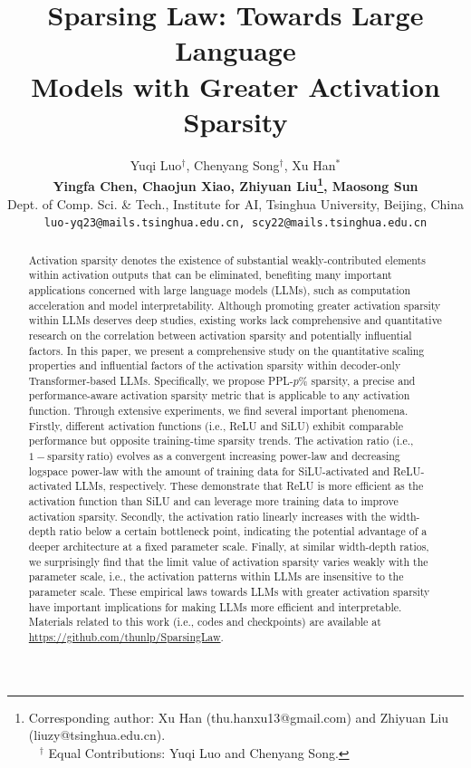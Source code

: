 \documentclass{article} %
\title{Sparsing Law: Towards Large Language \\Models with Greater Activation Sparsity}
\author{Yuqi Luo$^{\dagger}$, Chenyang Song$^{\dagger}$, Xu Han$^{*}$\\
\textbf{Yingfa Chen}\textbf{, Chaojun Xiao}\textbf{, Zhiyuan Liu\thanks{ Corresponding author: Xu Han (thu.hanxu13@gmail.com) and Zhiyuan Liu (liuzy@tsinghua.edu.cn).\\ $^{\quad\ \dagger}$ Equal Contributions: Yuqi Luo and Chenyang Song.}}\textbf{, Maosong Sun}\\
{\small Dept. of Comp. Sci. \& Tech., Institute for AI, Tsinghua University, Beijing, China}\\
{\tt\small luo-yq23@mails.tsinghua.edu.cn, scy22@mails.tsinghua.edu.cn}
}
\begin{document}
\maketitle

\begin{abstract}

Activation sparsity denotes the existence of substantial weakly-contributed elements within activation outputs that can be eliminated, benefiting many important applications concerned with large language models (LLMs), such as computation acceleration and model interpretability. 
Although promoting greater activation sparsity within LLMs deserves deep studies, existing works lack comprehensive and quantitative research on the correlation between activation sparsity and potentially influential factors.
In this paper, we present a comprehensive study on the quantitative scaling properties and influential factors of the activation sparsity within decoder-only Transformer-based LLMs. 
Specifically, we propose PPL-$p\%$ sparsity, a precise and performance-aware activation sparsity metric that is applicable to any activation function. 
Through extensive experiments, we find several important phenomena.
Firstly, different activation functions (i.e., ReLU and SiLU) exhibit comparable performance but opposite training-time sparsity trends. The activation ratio (i.e., $1-\mathrm{sparsity\ ratio}$) evolves as a convergent increasing power-law and decreasing logspace power-law with the amount of training data for SiLU-activated and ReLU-activated LLMs, respectively. These demonstrate that ReLU is more efficient as the activation function than SiLU and can leverage more training data to improve activation sparsity.
Secondly, the activation ratio linearly increases with the width-depth ratio below a certain bottleneck point, indicating the potential advantage of a deeper architecture at a fixed parameter scale.
Finally, at similar width-depth ratios, we surprisingly find that the limit value of activation sparsity varies weakly with the parameter scale, i.e., the activation patterns within LLMs are insensitive to the parameter scale. These empirical laws towards LLMs with greater activation sparsity have important implications for making LLMs more efficient and interpretable. Materials related to this work (i.e., codes and checkpoints) are available at \url{https://github.com/thunlp/SparsingLaw}.







\end{abstract}
\end{document}
